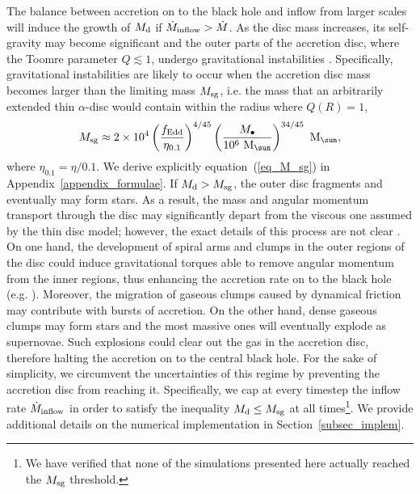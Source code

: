 \documentclass[a4paper,fleqn,usenatbib]{mnras}
\begin{document}
The balance between accretion on to the black hole and inflow from larger scales will induce the growth of $M_{\rm d}$ if $\dot{M}_{\rm inflow} > \dot{M}$.
As the disc mass increases, its self-gravity may become significant and the outer parts of the accretion disc, where the Toomre parameter $Q \lesssim 1$, undergo gravitational instabilities \citep{kolykhalov+80,pringle+81, lodato+07, perego+09}. 
Specifically, gravitational instabilities are likely to occur when the accretion disc mass becomes larger than the limiting mass $M_{\rm sg}$, i.e. the mass that an arbitrarily extended thin $\alpha$-disc would contain within the radius where $Q(R) = 1$, 
\begin{equation} \label{eq_M_sg}
M_{\rm sg} \approx 2 \times 10^{4} \left(\frac{f_{\rm Edd}}{ \eta_{0.1}} \right)^{4 / 45} \left( \frac{M_{\bullet}}{10^{6}~{\rm M}_{\sun}} \right)^{34 / 45}~{\rm M}_{\sun},
\end{equation}
where $\eta_{0.1} = \eta/0.1$. We derive explicitly equation~(\ref{eq_M_sg}) in Appendix~\ref{appendix_formulae}.
If $M_{\rm d} > M_{\rm sg}$, the outer disc fragments and eventually may form stars.
As a result, the mass and angular momentum transport through the disc may significantly depart from the viscous one assumed by the thin disc model; however, the exact details of this
process are not clear \citep{goodman+03}.
On one hand, the development of spiral arms and clumps in the outer regions of the disc could induce gravitational torques able to remove angular momentum from the inner regions, thus enhancing the accretion rate on to the black hole (e.g. \citealt{hopkins+11}).
Moreover, the migration of gaseous clumps caused by dynamical friction may contribute with bursts of accretion.
On the other hand, dense gaseous clumps may form stars and the most massive ones will eventually explode as supernovae.
Such explosions could clear out the gas in the accretion disc, therefore halting the accretion on to the central black hole.
For the sake of simplicity, we circumvent the uncertainties of this regime by preventing the accretion disc from reaching it.
Specifically, we cap at every timestep the inflow rate $\dot{M}_{\rm inflow}$ in order to satisfy the inequality $M_{\rm d} \leq M_{\rm sg}$ at all times\footnote{We have verified that none of the simulations presented here actually reached the $M_{\rm sg}$ threshold.}.
We provide additional details on the numerical implementation in Section~\ref{subsec_implem}. 

\end{document}
